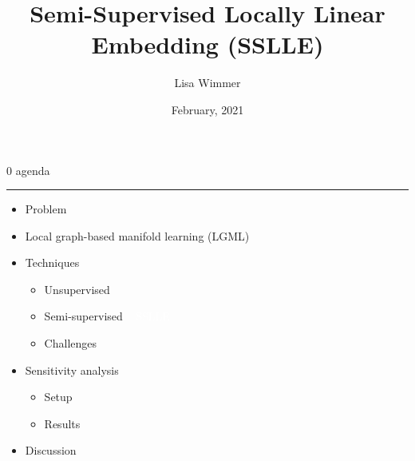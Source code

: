 \documentclass[11pt, compress, t, notes = noshow, xcolor = table, 
aspectratio = 1610]{beamer}
\title{Semi-Supervised Locally Linear Embedding (SSLLE)}
\author{Lisa Wimmer}
\date{February, 2021}
\newcommand{\maketag}[1]{\colorbox{highlightcol}{\textcolor{white}
{\MakeUppercase{#1}}}}
\newcommand{\highlight}[1]{\textcolor{highlightcol}{\textbf{#1}}}
\newcommand{\flexitem}[1]{\item[$\highlight{#1}$]}
\begin{document}


\LARGE
\begin{frame}[noframenumbering]{\textcolor{gray!90}{0 agenda}}
\normalsize
\vspace{-0.5cm}
\noindent \textcolor{gray!90}{\rule{\textwidth}{1pt}}
\smallskip

\begin{itemize}
\large
\flexitem{1} Problem
\flexitem{2} Local graph-based manifold learning (LGML)
\flexitem{3} Techniques
\begin{itemize}
  \large
  \flexitem{1} Unsupervised
  \flexitem{2} Semi-supervised ~ \maketag{SSLLE}
  \flexitem{3} Challenges
\end{itemize}
\flexitem{4} Sensitivity analysis
\begin{itemize}
  \large
  \flexitem{1} Setup
  \flexitem{2} Results
\end{itemize}
\flexitem{5} Discussion
\end{itemize}

\end{frame}

\end{document}
